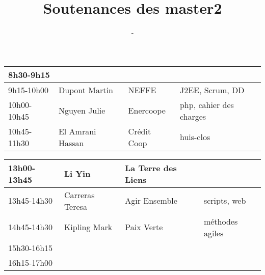 \documentclass{article}
\title{\huge Soutenances des master2}
\author{\Huge \lemaster}
\date{\huge \ladate - \lasalle}
\begin{document}
\maketitle
\pagestyle{empty}
\Large

\hspace*{-3cm}\begin{tabular}[t]{|l|l|l|l|}\hline
8h30-9h15 & & &\\ \hline
9h15-10h00 & Dupont Martin & NEFFE & J2EE, Scrum, DD\\ \hline
10h00-10h45 & Nguyen Julie & Enercoope & php, cahier des charges\\ \hline
10h45-11h30 & El Amrani Hassan & Crédit Coop & huis-clos\\ \hline
\end{tabular}

\bigskip
\hspace*{-3cm}\begin{tabular}[t]{|l|l|l|l|}
\hline
13h00-13h45 & Li Yin & La Terre des Liens & \\ \hline
13h45-14h30 & Carreras Teresa &	Agir Ensemble & scripts, web\\ \hline
\hline
14h45-14h30 & Kipling Mark & Paix Verte  & méthodes agiles \\ \hline
15h30-16h15 & & & \\ \hline
16h15-17h00 & & &\\ \hline
\end{tabular}
\end{document}
